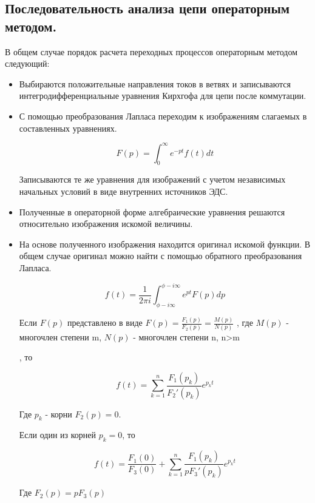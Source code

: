 \subsection{Последовательность анализа цепи операторным методом.}
В общем случае порядок расчета переходных процессов операторным
методом следующий:

\begin{itemize}
\item
 Выбираются положительные направления токов в ветвях и записываются интегродифференциальные уравнения Кирхгофа для цепи после коммутации.
\item

С помощью преобразования Лапласа переходим к изображениям слагаемых в составленных уравнениях.

\begin{equation}
F(p) = \int_0^\infty e^{-p t} f(t) dt
\end{equation}

 Записываются те же уравнения для изображений с учетом независимых начальных условий в виде внутренних источников ЭДС.

\item
 Полученные в операторной форме алгебраические уравнения решаются относительно изображения искомой величины.
\item
 На основе полученного изображения находится оригинал искомой функции. В общем случае оригинал можно найти с помощью обратного преобразования Лапласа.

\begin{equation}
f(t) = \frac{1}{2 \pi i} \int_{\phi - i \infty}^{\phi - i \infty} e^{p t} F(p) dp
\end{equation}


Если $F(p)$ представлено в виде $F(p)=\frac{F_1(p)}{F_2(p)}=\frac{M(p)}{N(p)}$ , где $M(p)$ - многочлен степени m, $N(p)$
- многочлен степени n, n>m

, то

\begin{equation}
f(t) = \sum_{k=1}^n \frac{F_1(p_k)}{F_2'(p_k)} e^{p_k t}
\end{equation}

Где $p_k$ - корни $F_2(p) = 0$.

Если один из корней $p_k = 0$, то 



\begin{equation}
f(t) =\frac{F_1(0)}{F_3(0)} + \sum_{k=1}^n \frac{F_1(p_k)}{p F_3'(p_k)} e^{p_k t}
\end{equation}

Где $F_2(p) = p F_3(p)$


\end{itemize}


\pagebreak
